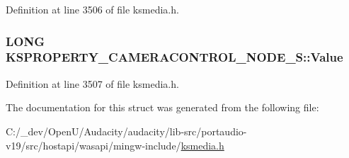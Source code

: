 Definition at line 3506 of file ksmedia.\+h.

\subsubsection[{\texorpdfstring{Value}{Value}}]{\setlength{\rightskip}{0pt plus 5cm}L\+O\+NG K\+S\+P\+R\+O\+P\+E\+R\+T\+Y\+\_\+\+C\+A\+M\+E\+R\+A\+C\+O\+N\+T\+R\+O\+L\+\_\+\+N\+O\+D\+E\+\_\+\+S\+::\+Value}\hypertarget{struct_k_s_p_r_o_p_e_r_t_y___c_a_m_e_r_a_c_o_n_t_r_o_l___n_o_d_e___s_a5d69be3ad4c2f3482b68f895cfacba7d}{}\label{struct_k_s_p_r_o_p_e_r_t_y___c_a_m_e_r_a_c_o_n_t_r_o_l___n_o_d_e___s_a5d69be3ad4c2f3482b68f895cfacba7d}


Definition at line 3507 of file ksmedia.\+h.



The documentation for this struct was generated from the following file\+:\begin{DoxyCompactItemize}
\item 
C\+:/\+\_\+dev/\+Open\+U/\+Audacity/audacity/lib-\/src/portaudio-\/v19/src/hostapi/wasapi/mingw-\/include/\hyperlink{ksmedia_8h}{ksmedia.\+h}\end{DoxyCompactItemize}
